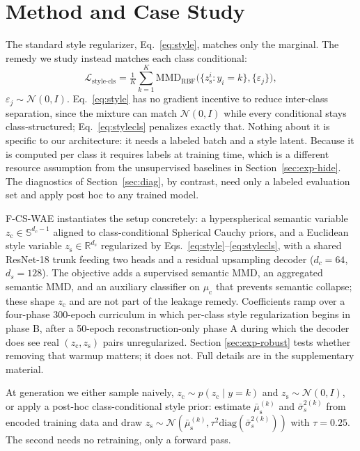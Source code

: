 \documentclass[letterpaper]{article} %
\newcommand{\ours}{F-CS-WAE}
\newcommand{\zc}{z_{\mathrm{c}}}
\newcommand{\zs}{z_{\mathrm{s}}}
\newcommand{\muc}{\mu_{\mathrm{c}}}
\newcommand{\mus}{\mu_{\mathrm{s}}}
\newcommand{\R}{\mathbb{R}}
\newcommand{\MMD}{\mathrm{MMD}}
\begin{document}
\section{Method and Case Study}
\label{sec:method}

The standard style regularizer, Eq.~\ref{eq:style}, matches only the
marginal. The remedy we study instead matches each class conditional:
\begin{equation}
\mathcal L_{\text{style-cls}} = \tfrac1K\textstyle\sum_{k=1}^{K}
\MMD_{\mathrm{RBF}}\bigl(\{\zs^i:y_i{=}k\},\{\varepsilon_j\}\bigr),
\label{eq:stylecls}
\end{equation}
$\varepsilon_j\sim\mathcal N(0,I)$. Eq.~\ref{eq:style} has no gradient
incentive to reduce inter-class separation, since the mixture can match
$\mathcal N(0,I)$ while every conditional stays class-structured;
Eq.~\ref{eq:stylecls} penalizes exactly that. Nothing about it is specific to
our architecture: it needs a labeled batch and a style latent. Because it is
computed per class it requires labels at training time, which is a different
resource assumption from the unsupervised baselines in
Section~\ref{sec:exp-hide}. The diagnostics of Section~\ref{sec:diag}, by
contrast, need only a labeled evaluation set and apply post hoc to any
trained model.

\ours{} instantiates the setup concretely: a hyperspherical semantic variable
$\zc\in\mathbb S^{d_c-1}$ aligned to class-conditional Spherical Cauchy
priors, and a Euclidean style variable $\zs\in\R^{d_s}$ regularized by
Eqs.~\ref{eq:style}--\ref{eq:stylecls}, with a shared ResNet-18 trunk feeding
two heads and a residual upsampling decoder ($d_c{=}64$, $d_s{=}128$). The
objective adds a supervised semantic MMD, an aggregated semantic MMD, and an
auxiliary classifier on $\muc$ that prevents semantic collapse; these shape
$\zc$ and are not part of the leakage remedy. Coefficients ramp over a
four-phase 300-epoch curriculum in which per-class style regularization
begins in phase B, after a 50-epoch reconstruction-only phase A during which
the decoder does see real $(\zc,\zs)$ pairs unregularized. Section
\ref{sec:exp-robust} tests whether removing that warmup matters; it does not.
Full details are in the supplementary material.

At generation we either sample naively, $\zc\sim p(\zc\mid y{=}k)$ and
$\zs\sim\mathcal N(0,I)$, or apply a post-hoc class-conditional style prior:
estimate $\bar\mus^{(k)}$ and $\bar\sigma_s^{2(k)}$ from encoded training
data and draw $\zs\sim\mathcal N(\bar\mus^{(k)},\tau^2\mathrm{diag}(\bar\sigma_s^{2(k)}))$
with $\tau{=}0.25$. The second needs no retraining, only a forward pass.
\end{document}
